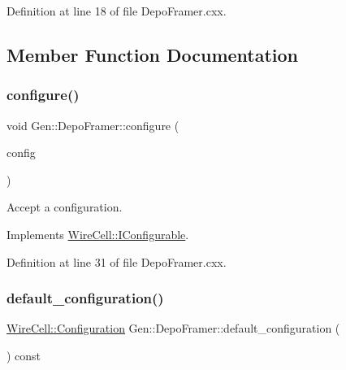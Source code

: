Definition at line 18 of file Depo\+Framer.\+cxx.



\subsection{Member Function Documentation}
\mbox{\label{class_wire_cell_1_1_gen_1_1_depo_framer_a3e476a422c8e5e56662d4040c0fdac69}} 
\subsubsection{\texorpdfstring{configure()}{configure()}}
{\footnotesize\ttfamily void Gen\+::\+Depo\+Framer\+::configure (\begin{DoxyParamCaption}\item[{const \hyperlink{namespace_wire_cell_a9f705541fc1d46c608b3d32c182333ee}{Wire\+Cell\+::\+Configuration} \&}]{config }\end{DoxyParamCaption})\hspace{0.3cm}{\ttfamily [virtual]}}



Accept a configuration. 



Implements \hyperlink{class_wire_cell_1_1_i_configurable_a57ff687923a724093df3de59c6ff237d}{Wire\+Cell\+::\+I\+Configurable}.



Definition at line 31 of file Depo\+Framer.\+cxx.

\mbox{\label{class_wire_cell_1_1_gen_1_1_depo_framer_adee1889f1ab532a31f8ae66e149ee8a4}} 
\subsubsection{\texorpdfstring{default\+\_\+configuration()}{default\_configuration()}}
{\footnotesize\ttfamily \hyperlink{namespace_wire_cell_a9f705541fc1d46c608b3d32c182333ee}{Wire\+Cell\+::\+Configuration} Gen\+::\+Depo\+Framer\+::default\+\_\+configuration (\begin{DoxyParamCaption}{ }\end{DoxyParamCaption}) const\hspace{0.3cm}{\ttfamily [virtual]}}



